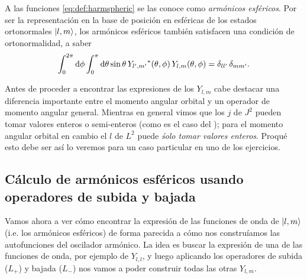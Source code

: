 \documentclass[10pt, a4paper]{article}
\newcommand{\Ylm}{Y_{l,m}}
\newcommand{\Ylmev}[2]{Y_{#1,#2}}
\numberwithin{equation}{subsection}
\begin{document}
A las funciones \eqref{eq:def:harmspheric} se las conoce como \emph{armónicos
esféricos}. Por ser la representación en la base de posición en esféricas de
los estados ortonormales $\ket{l,m}$, los armónicos esféricos también
satisfacen una condición de ortonormalidad, a saber
\begin{equation}
  \int_{0}^{2\pi}\dd{\phi}\int_{0}^{\pi}\dd{\theta}\sin\theta\,
    \conj{\Ylmev{l'}{m'}}(\theta,\phi)\,\Ylmev{l}{m}(\theta,\phi) =
    \delta_{ll'}\,\delta_{mm'}.
\end{equation}

\bigbreak
Antes de proceder a encontrar las expresiones de los $\Ylm$ cabe destacar una
diferencia importante entre el momento angular orbital y un operador de momento
angular general. Mientras en general vimos que los $j$ de $J^2$ pueden tomar
valores enteros o semi-enteros (como es el caso del \spinhalf); para el momento
angular orbital en cambio el $l$ de $L^2$ puede \emph{śolo tomar valores
enteros}. Proqué esto debe ser así lo veremos para un caso particular en uno de
los ejercicios.
\bigbreak

\subsection{Cálculo de armónicos esféricos usando operadores de subida y bajada}

Vamos ahora a ver cómo encontrar la expresión de las funciones de onda de
$\ket{l,m}$ (i.e. los armónicos esféricos) de forma parecida a cómo nos
construíamos las autofunciones del oscilador armónico. La idea es buscar la
expresión de una de las funciones de onda, por ejemplo de $\Ylmev{l}{l}$, y
luego aplicando los operadores de subida ($L_+$) y bajada ($L_-$) nos vamos a
poder construir todas las otras $\Ylm$.

\bigbreak
\end{document}
